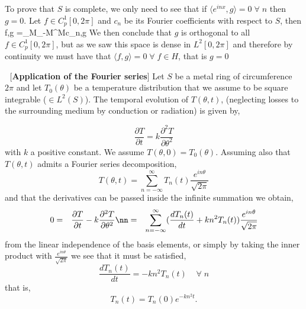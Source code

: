 

To prove that $S$ is complete, we only need to see that if 
$\langle e^{inx},g \rangle =0\; \forall\; n $ then $g =0$.
Let $f \in C^1_p[0,2\pi]$ and $c_n$ be its Fourier coefficients with respect to
$S$, then
\beq
\langle f,g \rangle =\lim_{M\to \ifi}\langle \sum_{-M}^Mc_n,g 
\eeq
We then conclude that $g$ is orthogonal to all $f \in
C^1_p[0,2\pi]$, but as we saw this space is dense in
$L^2[0,2\pi]$ and therefore by continuity we must have
that $\langle f,g \rangle = 0\; \forall\; f \in H$, that is $g=0$ 
\epru
\espa

\ejem $\;$ [\textbf{Application of the Fourier series}]
Let $S$ be a metal ring of circumference $2\pi$ and let $T_0(\theta)$ be a temperature distribution that we assume to be square integrable ($\in L^2(S)$).
The temporal evolution of $T(\theta,t)$, 
(neglecting losses to the surrounding medium by conduction or radiation) is given by,

\begin{equation}
  \label{eq:calor}
  \frac{\partial T}{\partial t} = k \frac{\partial^2 T}{\partial \theta^2}
\end{equation}
%
with $k$ a positive constant. We assume $T(\theta,0)=T_0(\theta)$.
Assuming also that $T(\theta,t)$ admits
a Fourier series decomposition,
\begin{equation}
  \label{eq:T_fourier}
  T(\theta,t) = \sum^{\infty}_{n=-\infty} T_n(t) \frac{e^{in\theta}}{\sqrt{2\pi}}
\end{equation}
%
and that the derivatives can be passed
inside the infinite summation we obtain,
\begin{eqnarray}
  0&=&\frac{\partial T}{\partial t} - k \frac{\partial^2 T}{\partial \theta^2}\nn
   &=& \sum^{\infty}_{n=-\infty}(\frac{dT_n(t)}{dt} + k n^2 T_n(t)) \frac{e^{in\theta}}{\sqrt{2\pi}}
\end{eqnarray}
%
from the linear independence of the basis elements, or simply by taking the inner product with $\frac{e^{in\theta}}{\sqrt{2\pi}}$ we see that
it must be satisfied,
\begin{equation}
  \frac{dT_n(t)}{dt} = - k n^2 T_n(t) \;\;\;\; \forall \; n
\end{equation}
%
that is,
\begin{equation}
  T_n(t) = T_n(0) e^{-kn^2t}.
\end{equation}

